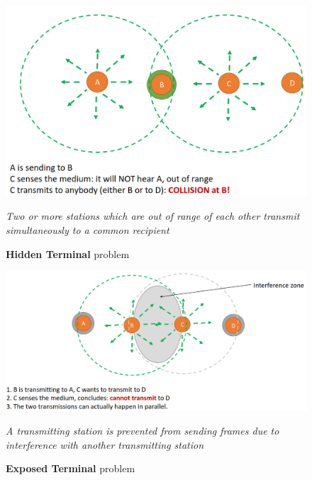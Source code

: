 \begin{figure}[htbp]
   \centering
   \includegraphics{images/hiddenterminal.png}
   \caption{\textbf{Hidden Terminal} problem}
   \textit{Two or more stations which are out of range of each other transmit simultaneously to a common
   recipient}
   \label{fig:hiddenterminal}
\end{figure}


\begin{figure}[htbp]
   \centering
   \includegraphics{images/exposedterminal.png}
   \caption{\textbf{Exposed Terminal} problem}
   \textit{A transmitting station is prevented from sending frames due to interference with another
   transmitting station}
   \label{fig:exposedterminal}
\end{figure}

